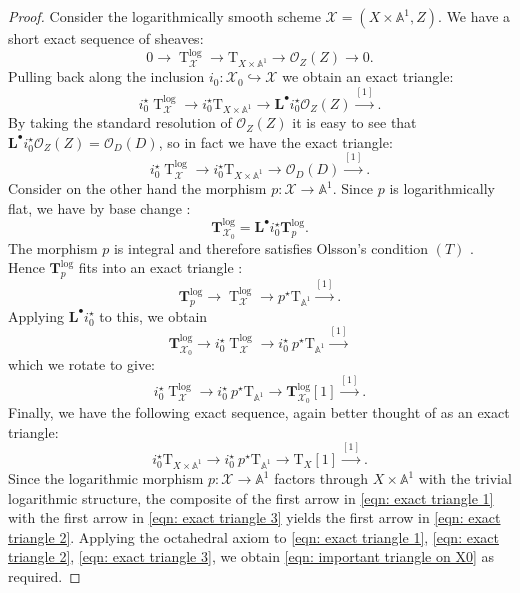 \documentclass[11pt]{amsart}
\theoremstyle{definition}
\theoremstyle{definition}
\newcommand{\op}[1]{\operatorname{#1}}
\newcommand{\Tlog}{\op{T}^{\op{log}}}
\newcommand{\TTlog}{\mathbf{T}^{\op{log}}}
\newcommand{\Aaff}{\mathbb{A}}
\newcommand{\T}{\mathrm{T}}
\newcommand{\OO}{\mathcal{O}}
\newcommand{\Xcal}{\mathcal{X}}
\newcommand{\Lder}{\mathbf{L}^\bullet}
\begin{document}
\begin{proof}
Consider the logarithmically smooth scheme $\Xcal=(X\times\Aaff^{\! 1},Z)$. We have a short exact sequence of sheaves:
\begin{equation*} 0 \to \Tlog_{\Xcal} \to \T_{X \times \Aaff^{\! 1}} \to \OO_Z(Z) \to 0.\end{equation*}
Pulling back along the inclusion $i_0 \colon \Xcal_0 \hookrightarrow \Xcal$ we obtain an exact triangle:
\begin{equation*} i_0^\star \Tlog_{\Xcal} \to i_0^\star \T_{X\times \Aaff^{\! 1}} \to \Lder i_0^\star \OO_Z(Z) \xrightarrow{[1]}.\end{equation*}
By taking the standard resolution of $\OO_Z(Z)$ it is easy to see that $\Lder i_0^\star \OO_Z(Z)=\OO_D(D)$, so in fact we have the exact triangle:
\begin{equation}\label{eqn: exact triangle 1} i_0^\star \Tlog_{\Xcal} \to i_0^\star \T_{X\times \Aaff^{\! 1}} \to \OO_D(D) \xrightarrow{[1]}.\end{equation}
Consider on the other hand the morphism $p \colon \Xcal \to \Aaff^{\! 1}$. Since $p$ is logarithmically flat, we have by base change \cite[1.1(iv)]{OlssonCotangent}:
\begin{equation*} \TTlog_{\Xcal_0} = \Lder i_0^\star \TTlog_{p}. \end{equation*}
The morphism $p$ is integral and therefore satisfies Olsson's condition $(T)$ \cite[1.3]{OlssonCotangent}. Hence $\TTlog_{p}$ fits into an exact triangle \cite[1.1(v)]{OlssonCotangent}:
\begin{equation*} \TTlog_p \to \Tlog_{\Xcal} \to p^\star \T_{\Aaff^{\! 1}} \xrightarrow{[1]}.\end{equation*}
Applying $\Lder i_0^\star$ to this, we obtain
\begin{equation*} \TTlog_{\Xcal_0} \to i_0^\star \Tlog_{\Xcal} \to i_0^\star \ p^\star \T_{\Aaff^{\! 1}} \xrightarrow{[1]}\end{equation*}
which we rotate to give:
\begin{equation} \label{eqn: exact triangle 2}
i_0^\star \Tlog_{\Xcal} \to i_0^\star \ p^\star \T_{\Aaff^{\! 1}} \to \TTlog_{\Xcal_0}[1] \xrightarrow{[1]}.\end{equation}
Finally, we have the following exact sequence, again better thought of as an exact triangle:
\begin{equation} \label{eqn: exact triangle 3} i_0^\star \T_{X \times \Aaff^{\! 1}} \to i_0^\star \ p^\star \T_{\Aaff^{\! 1}} \to \T_{X}[1] \xrightarrow{[1]}.\end{equation}
Since the logarithmic morphism $p \colon \Xcal \to \Aaff^{\! 1}$ factors through $X \times \Aaff^{\! 1}$ with the trivial logarithmic structure, the composite of the first arrow in \eqref{eqn: exact triangle 1} with the first arrow in \eqref{eqn: exact triangle 3} yields the first arrow in \eqref{eqn: exact triangle 2}. Applying the octahedral axiom to \eqref{eqn: exact triangle 1}, \eqref{eqn: exact triangle 2}, \eqref{eqn: exact triangle 3}, we obtain \eqref{eqn: important triangle on X0} as required.
\end{proof}
\end{document}
